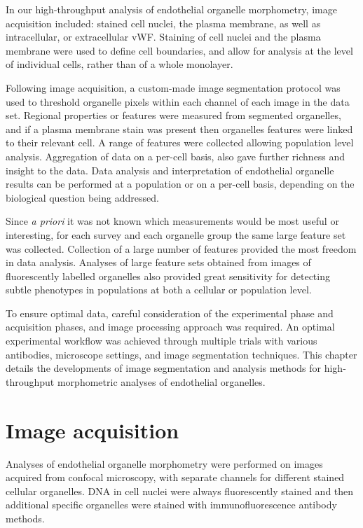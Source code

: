 In our high-throughput analysis of endothelial organelle morphometry, image acquisition included: stained cell nuclei, the plasma membrane, as well as intracellular, or extracellular vWF. Staining of cell nuclei and the plasma membrane were used to define cell boundaries, and allow for analysis at the level of individual cells, rather than of a whole monolayer.

Following image acquisition, a custom-made image segmentation protocol was used to threshold organelle pixels within each channel of each image in the data set. Regional properties or features were measured from segmented organelles, and if a plasma membrane stain was present then organelles features were linked to their relevant cell. A range of features were collected allowing population level analysis. Aggregation of data on a per-cell basis, also gave further richness and insight to the data. Data analysis and interpretation of endothelial organelle results can be performed at a population or on a per-cell basis, depending on the biological question being addressed.

Since \emph{a priori} it was not known which measurements would be most useful or interesting, for each survey and each organelle group the same large feature set was collected. Collection of a large number of features provided the most freedom in data analysis. Analyses of large feature sets obtained from images of fluorescently labelled organelles also provided great sensitivity for detecting subtle phenotypes in populations at both a cellular or population level.

To ensure optimal data, careful consideration of the experimental phase and acquisition phases, and image processing approach was required. An optimal experimental workflow was achieved through multiple trials with various antibodies, microscope settings, and image segmentation techniques. This chapter details the developments of image segmentation and analysis methods for high-throughput morphometric analyses of endothelial organelles.

\section{Image acquisition}
\label{endothelial_morphometry:image_acquisition}
Analyses of endothelial organelle morphometry were performed on images acquired from confocal microscopy, with separate channels for different stained cellular organelles. DNA in cell nuclei were always fluorescently stained and then additional specific organelles were stained with immunofluorescence antibody methods.

